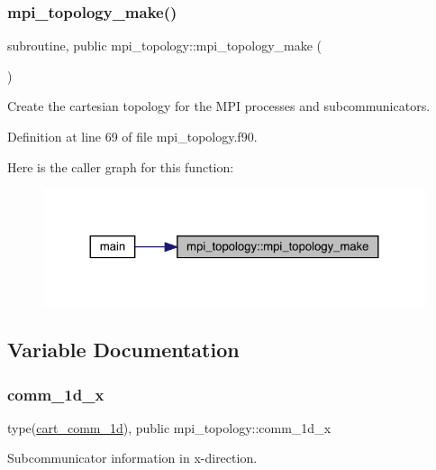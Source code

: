 \subsubsection{\texorpdfstring{mpi\_topology\_make()}{mpi\_topology\_make()}}
{\footnotesize\ttfamily subroutine, public mpi\+\_\+topology\+::mpi\+\_\+topology\+\_\+make (\begin{DoxyParamCaption}{ }\end{DoxyParamCaption})}



Create the cartesian topology for the M\+PI processes and subcommunicators. 



Definition at line 69 of file mpi\+\_\+topology.\+f90.

Here is the caller graph for this function\+:
\nopagebreak
\begin{figure}[H]
\begin{center}
\leavevmode
\includegraphics[width=324pt]{namespacempi__topology_a8819f16f50aded913f17520a29d3ec4c_icgraph}
\end{center}
\end{figure}


\subsection{Variable Documentation}
\mbox{\label{namespacempi__topology_a4ef8d80f442649d77707d5ebeeefa391}} 
\subsubsection{\texorpdfstring{comm\_1d\_x}{comm\_1d\_x}}
{\footnotesize\ttfamily type(\mbox{\hyperlink{structmpi__topology_1_1cart__comm__1d}{cart\+\_\+comm\+\_\+1d}}), public mpi\+\_\+topology\+::comm\+\_\+1d\+\_\+x}



Subcommunicator information in x-\/direction. 



